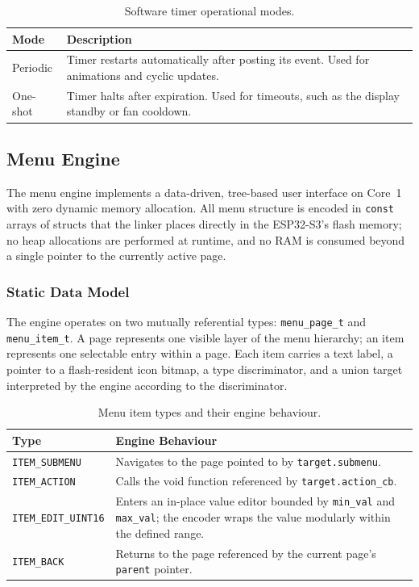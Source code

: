 \begin{table}[H]
  \caption{Software timer operational modes.}
  \label{tab:timer_modes}
  \centering
  \begin{tabularx}{\textwidth}{|l|X|}
    \hline
    \textbf{Mode} & \textbf{Description} \\ \hline \hline
    Periodic & Timer restarts automatically after posting its event. Used for animations and cyclic updates. \\ \hline
    One-shot & Timer halts after expiration. Used for timeouts, such as the display standby or fan cooldown. \\ \hline
  \end{tabularx}
\end{table}


\subsection{Menu Engine}
\label{sec:menu_engine}

The menu engine implements a data-driven, tree-based user interface on Core~1 with zero dynamic memory allocation.
All menu structure is encoded in \texttt{const} arrays of structs that the linker places directly in the ESP32-S3's flash memory; no heap allocations are performed at runtime, and no \ac{RAM} is consumed beyond a single pointer to the currently active page.

\subsubsection{Static Data Model}
\label{sec:menu_data_model}

The engine operates on two mutually referential types: \texttt{menu\_page\_t} and \texttt{menu\_item\_t}.
A page represents one visible layer of the menu hierarchy; an item represents one selectable entry within a page.
Each item carries a text label, a pointer to a flash-resident icon bitmap, a type discriminator, and a union target interpreted by the engine according to the discriminator.

\begin{table}[H]
  \caption{Menu item types and their engine behaviour.}
  \label{tab:menu_item_types}
  \centering
  \begin{tabularx}{\textwidth}{|l|X|}
    \hline
    \textbf{Type} & \textbf{Engine Behaviour} \\ \hline \hline
    \texttt{ITEM\_SUBMENU}     & Navigates to the page pointed to by \texttt{target.submenu}. \\ \hline
    \texttt{ITEM\_ACTION}      & Calls the void function referenced by \texttt{target.action\_cb}. \\ \hline
    \texttt{ITEM\_EDIT\_UINT16}& Enters an in-place value editor bounded by \texttt{min\_val} and \texttt{max\_val}; the encoder wraps the value modularly within the defined range. \\ \hline
    \texttt{ITEM\_BACK}        & Returns to the page referenced by the current page's \texttt{parent} pointer. \\ \hline
  \end{tabularx}
\end{table}

